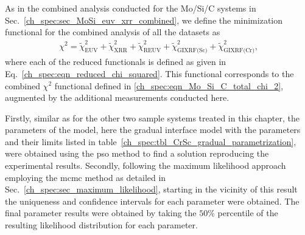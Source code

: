 As in the combined analysis conducted for the Mo/Si/C systems in Sec.~\ref{ch_spec:sec_MoSi_euv_xrr_combined}, we define the minimization functional for the combined analysis of all the datasets as
\begin{align}
\chi^2 = \tilde{\chi}^2_\text{EUV} +\tilde{\chi}^2_\text{XRR} 
+\tilde{\chi}^2_\text{REUV} + 
\tilde{\chi}^2_\text{GIXRF(Sc)}+\tilde{\chi}^2_\text{GIXRF(Cr)}\text{,} 
\label{ch_spec:eqn_CrSc_total_chi_2}
\end{align}
where each of the reduced functionals is defined as given in Eq.~\eqref{ch_spec:eqn_reduced_chi_squared}. This functional corresponds to the combined $\chi^2$ functional defined in \eqref{ch_spec:eqn_Mo_Si_C_total_chi_2}, augmented by the additional measurements conducted here.

Firstly, similar as for the other two sample systems treated in this chapter, the parameters of the model, here the gradual interface model with the parameters and their limits listed in table~\ref{ch_spec:tbl_CrSc_gradual_parametrization}, were obtained using the \gls{pso} method to find a solution reproducing the experimental results. Secondly, following the maximum likelihood approach employing the \gls{mcmc} method as detailed in Sec.~\ref{ch_spec:sec_maximum_likelihood}, starting in the vicinity of this result the uniqueness and confidence intervals for each parameter were obtained. The final parameter results were obtained by taking the $50\%$ percentile of the resulting likelihood distribution for each parameter.

